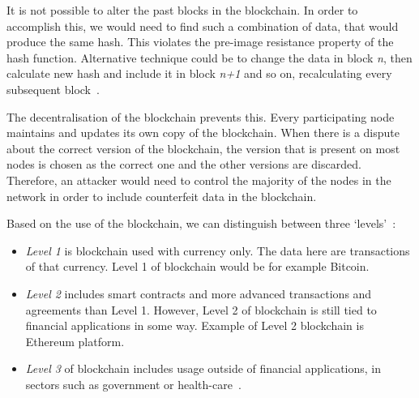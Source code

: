 It is not possible to alter the past blocks in the blockchain. In order to accomplish this, we would need to find such a combination of data, that would produce the same hash. This violates the pre-image resistance property of the hash function. Alternative technique could be to change the data in block \textit{n}, then calculate new hash and include it in block \textit{n+1} and so on, recalculating every subsequent block~\cite[3]{NakamotoBitcoin:System}.

The decentralisation of the blockchain prevents this. Every participating node maintains and updates its own copy of the blockchain. When there is a dispute about the correct version of the blockchain, the version that is present on most nodes is chosen as the correct one and the other versions are discarded. Therefore, an attacker would need to control the majority of the nodes in the network in order to include counterfeit data in the blockchain.

Based on the use of the blockchain, we can distinguish between three `levels'~\cite{Swan2015BlockchainEconomy}:
\begin{itemize}[noitemsep, nolistsep]
    \item \textit{Level 1} is blockchain used with currency only. The data here are transactions of that currency. Level 1 of blockchain would be for example Bitcoin.
    \item \textit{Level 2} includes smart contracts and more advanced transactions and agreements than Level 1. However, Level 2 of blockchain is still tied to financial applications in some way. Example of Level 2 blockchain is Ethereum platform.
    \item \textit{Level 3} of blockchain includes usage outside of financial applications, in sectors such as government or health-care~\cite{Swan2015BlockchainEconomy}.
\end{itemize}

